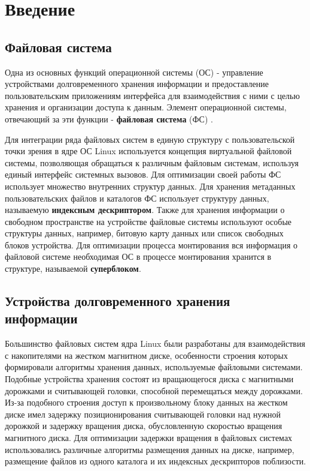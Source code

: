 \section{Введение}
\label{sec:Chapter0} 

\subsection{Файловая система}

Одна из основных функций операционной системы (ОС) - управление устройствами долговременного хранения информации и предоставление пользовательским приложениям интерфейса для взаимодействия с ними с целью хранения и организации доступа к данным. Элемент операционной системы, отвечающий за эти функции - \textbf{файловая система} (ФС) \cite{osbook}. 

Для интеграции ряда файловых систем в единую структуру с пользовательской точки зрения в ядре ОС Linux используется концепция виртуальной файловой системы, позволяющая обращаться к различным файловым системам, используя единый интерфейс системных вызовов. Для оптимизации своей работы ФС использует множество внутренних структур данных. Для хранения метаданных пользовательских файлов и каталогов ФС использует структуру данных, называемую \textbf{индексным дескриптором}. Также для хранения информации о свободном пространстве на устройстве файловые системы используют особые структуры данных, например, битовую карту данных или список свободных блоков устройства. Для оптимизации процесса монтирования вся информация о файловой системе необходимая ОС в процессе монтирования хранится в структуре, называемой \textbf{суперблоком}.

\subsection{Устройства долговременного хранения информации}

Большинство файловых систем ядра Linux были разработаны для взаимодействия с накопителями на жестком магнитном диске, особенности строения которых формировали алгоритмы хранения данных, используемые файловыми системами. Подобные устройства хранения состоят из вращающегося диска с магнитными дорожками и считывающей головки, способной перемещаться между дорожками. Из-за подобного строения доступ к произвольному блоку данных на жестком диске имел задержку позиционирования считывающей головки над нужной дорожкой и задержку вращения диска, обусловленную скоростью вращения магнитного диска. Для оптимизации задержки вращения в файловых системах использовались различные алгоритмы размещения данных на диске, например, размещение файлов из одного каталога и их индексных дескрипторов поблизости.

